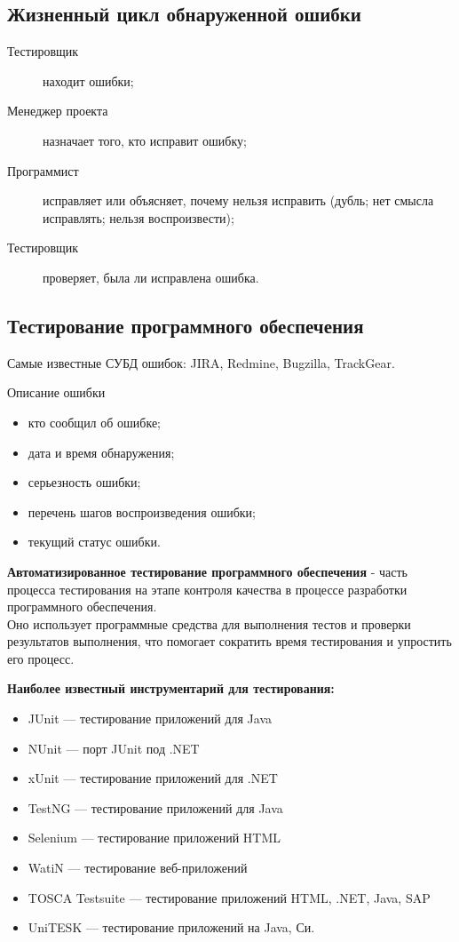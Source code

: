 \subsection{Жизненный цикл обнаруженной ошибки}
\begin{description}
  \item[Тестировщик] находит ошибки;
  \item[Менеджер проекта] назначает того, кто исправит ошибку;
  \item[Программист] исправляет или объясняет, почему нельзя исправить (дубль; нет смысла исправлять; нельзя воспроизвести);
  \item[Тестировщик] проверяет, была ли исправлена ошибка.
\end{description}
\subsection{Тестирование программного обеспечения}
Самые известные СУБД ошибок: JIRA, Redmine, Bugzilla, TrackGear.
\begin{center}
  Описание ошибки
\end{center}
\begin{itemize}
  \item кто сообщил об ошибке;
  \item дата и время обнаружения;
  \item серьезность ошибки;
  \item перечень шагов воспроизведения ошибки;
  \item текущий статус ошибки.
\end{itemize}
\textbf{Автоматизированное тестирование программного обеспечения} - часть процесса тестирования на этапе контроля качества в процессе разработки программного обеспечения.
\\Оно использует программные средства для выполнения тестов и проверки результатов выполнения, что помогает сократить время тестирования и упростить его процесс.
\begin{center}
\textbf{Наиболее известный инструментарий для тестирования:}
\end{center}
\begin{itemize}
  \item JUnit — тестирование приложений для Java
  \item NUnit — порт JUnit под .NET
  \item xUnit — тестирование приложений для .NET
  \item TestNG — тестирование приложений для Java
  \item Selenium — тестирование приложений HTML
  \item WatiN — тестирование веб-приложений
  \item TOSCA Testsuite — тестирование приложений HTML, .NET, Java, SAP
  \item UniTESK — тестирование приложений на Java, Си.
\end{itemize}
